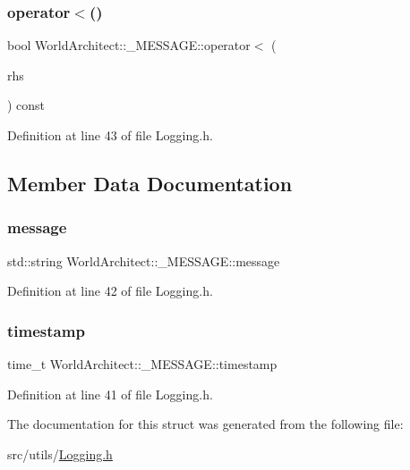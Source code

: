\subsubsection{\texorpdfstring{operator$<$()}{operator<()}}
{\footnotesize\ttfamily bool World\+Architect\+::\+\_\+\+M\+E\+S\+S\+A\+G\+E\+::operator$<$ (\begin{DoxyParamCaption}\item[{const struct \mbox{\hyperlink{struct_world_architect_1_1___m_e_s_s_a_g_e}{\+\_\+\+M\+E\+S\+S\+A\+GE}} \&}]{rhs }\end{DoxyParamCaption}) const\hspace{0.3cm}{\ttfamily [inline]}}



Definition at line 43 of file Logging.\+h.



\subsection{Member Data Documentation}
\mbox{\label{struct_world_architect_1_1___m_e_s_s_a_g_e_adddd59e01e902c23dd42b2ce34dff503}} 
\subsubsection{\texorpdfstring{message}{message}}
{\footnotesize\ttfamily std\+::string World\+Architect\+::\+\_\+\+M\+E\+S\+S\+A\+G\+E\+::message}



Definition at line 42 of file Logging.\+h.

\mbox{\label{struct_world_architect_1_1___m_e_s_s_a_g_e_a9b9f0fbc20e147685fd92c342dfa2c46}} 
\subsubsection{\texorpdfstring{timestamp}{timestamp}}
{\footnotesize\ttfamily time\+\_\+t World\+Architect\+::\+\_\+\+M\+E\+S\+S\+A\+G\+E\+::timestamp}



Definition at line 41 of file Logging.\+h.



The documentation for this struct was generated from the following file\+:\begin{DoxyCompactItemize}
\item 
src/utils/\mbox{\hyperlink{_logging_8h}{Logging.\+h}}\end{DoxyCompactItemize}
